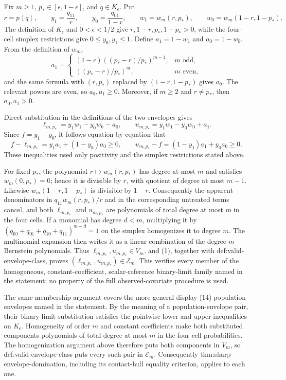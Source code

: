 Fix \(m\geq1\), \(p_*\in[\epsilon,1-\epsilon]\), and \(q\in K_{\epsilon}\). Put
\[
 r=p(q),\qquad y_1=\frac{q_{11}}r,\qquad y_0=\frac{q_{01}}{1-r},
 \qquad w_1=w_m(r,p_*),\qquad w_0=w_m(1-r,1-p_*).
\]
The definition of \(K_{\epsilon}\) and \(0<\epsilon<1/2\) give
\(r,1-r,p_*,1-p_*>0\), while the four-cell simplex restrictions give
\(0\leq y_0,y_1\leq1\). Define
\(a_1=1-w_1\) and \(a_0=1-w_0\). From the definition of \(w_m\),
\[
 a_1=
 \begin{cases}
 (1-r)\left((p_*-r)/p_*\right)^{m-1},&m\text{ odd},\\
 \left((p_*-r)/p_*\right)^m,&m\text{ even},
 \end{cases}
\]
and the same formula with \((r,p_*)\) replaced by
\((1-r,1-p_*)\) gives \(a_0\). The relevant powers are even, so
\(a_0,a_1\geq0\). Moreover, if \(m\geq2\) and \(r\neq p_*\), then
\(a_0,a_1>0\).

Direct substitution in the definitions of the two envelopes gives
\[
 \ell_{m,p_*}=y_1w_1-y_0w_0-a_0,
 \qquad
 u_{m,p_*}=y_1w_1-y_0w_0+a_1.
\]
Since \(f=y_1-y_0\), it follows equation by equation that
\[
 f-\ell_{m,p_*}=y_1a_1+(1-y_0)a_0\geq0,
 \qquad
 u_{m,p_*}-f=(1-y_1)a_1+y_0a_0\geq0.                 \tag{1}
\]
These inequalities used only positivity and the simplex restrictions stated above.

For fixed \(p_*\), the polynomial \(r\mapsto w_m(r,p_*)\) has degree at most
\(m\) and satisfies \(w_m(0,p_*)=0\); hence it is divisible by \(r\), with
quotient of degree at most \(m-1\). Likewise
\(w_m(1-r,1-p_*)\) is divisible by \(1-r\). Consequently the apparent
denominators in \(q_{11}w_m(r,p_*)/r\) and in the corresponding untreated
terms cancel, and both \(\ell_{m,p_*}\) and \(u_{m,p_*}\) are polynomials of
total degree at most \(m\) in the four cells. If a monomial has degree
\(d<m\), multiplying it by
\((q_{00}+q_{01}+q_{10}+q_{11})^{m-d}=1\) on the simplex homogenizes it to
degree \(m\). The multinomial expansion then writes it as a linear combination
of the degree-\(m\) Bernstein polynomials. Thus
\(\ell_{m,p_*},u_{m,p_*}\in V_m\), and (1), together with
def:valid-envelope-class, proves
\((\ell_{m,p_*},u_{m,p_*})\in\mathcal E_m\). This verifies every member of
the homogeneous, constant-coefficient, scalar-reference binary-limit family
named in the statement; no property of the full observed-covariate procedure is
used.

The same membership argument covers the more general display-(14) population
envelopes named in the statement. By the meaning of a population-envelope
pair, their binary-limit substitution satisfies the pointwise lower and upper
inequalities on \(K_{\epsilon}\). Homogeneity of order \(m\) and constant
coefficients make both substituted components polynomials of total degree at
most \(m\) in the four cell probabilities. The homogenization argument above
therefore puts both components in \(V_m\), so
def:valid-envelope-class puts every such pair in \(\mathcal E_m\).
Consequently thm:sharp-envelope-domination, including its contact-hull equality
criterion, applies to each one.

